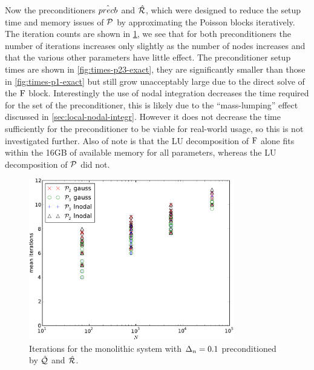 Now the preconditioners $\hat{precb}$ and $\hat{\mathcal{R}}$, which were designed to reduce the setup time and memory issues of $\mathcal{P}$ by approximating the Poisson blocks iteratively.
The iteration counts are shown in \cref{fig:its-p23-exact}, we see that for both preconditioners the number of iterations increases only slightly as the number of nodes increases and that the various other parameters have little effect.
The preconditioner setup times are shown in \cref{fig:times-p23-exact}, they are significantly smaller than those in \cref{fig:times-p1-exact} but still grow unacceptably large due to the direct solve of the $\mathrm{F}$ block.
Interestingly the use of nodal integration decreases the time required for the set of the preconditioner, this is likely due to the ``mass-lumping'' effect discussed in \cref{sec:local-nodal-integr}.
However it does not decrease the time sufficiently for the preconditioner to be viable for real-world usage, so this is not investigated further.
Also of note is that the LU decomposition of $\mathrm{F}$ alone fits within the 16GB of available memory for all parameters, whereas the LU decomposition of $\mathcal{P}$ did not.

\begin{figure}
  \centering
  \includegraphics[width=0.8\textwidth]{plots/linear_solvers_p2p3/implicitexact-meanofnsolveritersvsinitialnnode.pdf}
  \caption{Iterations for the monolithic system with $\Delta_{n}=0.1$ preconditioned by $\hat{\mathcal{Q}}$ and $\hat{\mathcal{R}}$.}
  \label{fig:its-p23-exact}
\end{figure}

